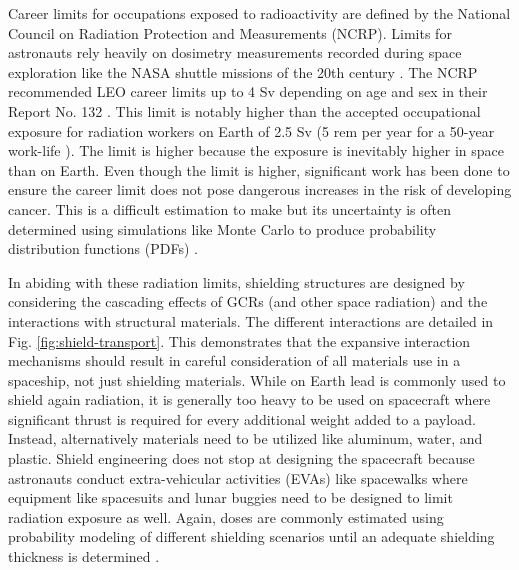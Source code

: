 Career limits for occupations exposed to radioactivity are defined by the National Council on Radiation Protection and Measurements (NCRP). Limits for astronauts rely heavily on dosimetry measurements recorded during space exploration like the NASA shuttle missions of the 20th century \cite{cucinotta-shuttle}. The NCRP recommended LEO career limits up to 4 Sv depending on age and sex in their Report No. 132 \cite{ncrp-132}. This limit is notably higher than the accepted occupational exposure for radiation workers on Earth of 2.5 Sv (5 rem per year for a 50-year work-life \cite{lamarsh}). The limit is higher because the exposure is inevitably higher in space than on Earth. Even though the limit is higher, significant work has been done to ensure the career limit does not pose dangerous increases in the risk of developing cancer. This is a difficult estimation to make but its uncertainty is often determined using simulations like Monte Carlo to produce probability distribution functions (PDFs) \cite{cucinotta-pdf}.

In abiding with these radiation limits, shielding structures are designed by considering the cascading effects of GCRs (and other space radiation) and the interactions with structural materials. The different interactions are detailed in Fig. \ref{fig:shield-transport}. This demonstrates that the expansive interaction mechanisms should result in careful consideration of all materials use in a spaceship, not just shielding materials. While on Earth lead is commonly used to shield again radiation, it is generally too heavy to be used on spacecraft where significant thrust is required for every additional weight added to a payload. Instead, alternatively materials need to be utilized like aluminum, water, and plastic. Shield engineering does not stop at designing the spacecraft because astronauts conduct extra-vehicular activities (EVAs) like spacewalks where equipment like spacesuits and lunar buggies need to be designed to limit radiation exposure as well. Again, doses are commonly estimated using probability modeling of different shielding scenarios until an adequate shielding thickness is determined \cite{eva-model}.

